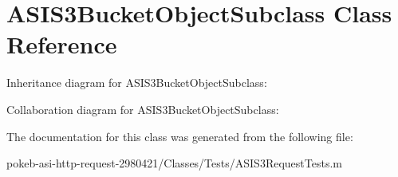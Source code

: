 \hypertarget{interface_a_s_i_s3_bucket_object_subclass}{
\section{\-A\-S\-I\-S3\-Bucket\-Object\-Subclass \-Class \-Reference}
\label{interface_a_s_i_s3_bucket_object_subclass}
}


\-Inheritance diagram for \-A\-S\-I\-S3\-Bucket\-Object\-Subclass\-:


\-Collaboration diagram for \-A\-S\-I\-S3\-Bucket\-Object\-Subclass\-:


\-The documentation for this class was generated from the following file\-:\begin{DoxyCompactItemize}
\item 
pokeb-\/asi-\/http-\/request-\/2980421/\-Classes/\-Tests/\-A\-S\-I\-S3\-Request\-Tests.\-m\end{DoxyCompactItemize}
